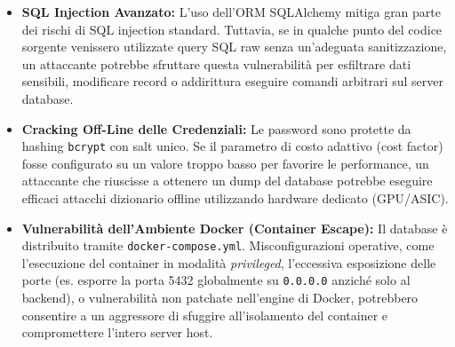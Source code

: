 \begin{itemize}
    \item \textbf{SQL Injection Avanzato:} L'uso dell'ORM SQLAlchemy mitiga gran parte dei rischi di SQL injection standard. Tuttavia, se in qualche punto del codice sorgente venissero utilizzate query SQL raw senza un'adeguata sanitizzazione, un attaccante potrebbe sfruttare questa vulnerabilità per esfiltrare dati sensibili, modificare record o addirittura eseguire comandi arbitrari sul server database.
    \item \textbf{Cracking Off-Line delle Credenziali:} Le password sono protette da hashing \texttt{bcrypt} con salt unico. Se il parametro di costo adattivo (cost factor) fosse configurato su un valore troppo basso per favorire le performance, un attaccante che riuscisse a ottenere un dump del database potrebbe eseguire efficaci attacchi dizionario offline utilizzando hardware dedicato (GPU/ASIC).
    \item \textbf{Vulnerabilità dell'Ambiente Docker (Container Escape):} Il database è distribuito tramite \texttt{docker-compose.yml}. Misconfigurazioni operative, come l'esecuzione del container in modalità \textit{privileged}, l'eccessiva esposizione delle porte (es. esporre la porta 5432 globalmente su \texttt{0.0.0.0} anziché solo al backend), o vulnerabilità non patchate nell'engine di Docker, potrebbero consentire a un aggressore di sfuggire all'isolamento del container e compromettere l'intero server host.
\end{itemize}



